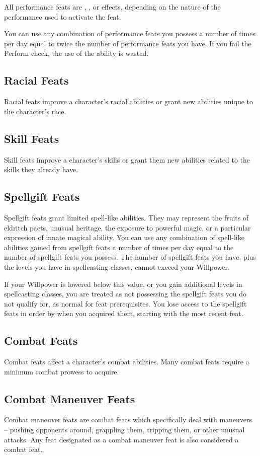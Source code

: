 All performance feats are , , or  effects, depending on the nature of the performance used to activate the feat.

You can use any combination of performance feats you possess a number of times per day equal to twice the number of performance feats you have.
If you fail the Perform check, the use of the ability is wasted.

\subsection{Racial Feats}\label{Racial Feats}
Racial feats improve a character's racial abilities or grant new abilities unique to the character's race.

\subsection{Skill Feats}
Skill feats improve a character's skills or grant them new abilities related to the skills they already have.

\subsection{Spellgift Feats}
Spellgift feats grant limited spell-like abilities.
They may represent the fruits of eldritch pacts, unusual heritage, the exposure to powerful magic, or a particular expression of innate magical ability.
You can use any combination of spell-like abilities gained from spellgift feats a number of times per day equal to the number of spellgift feats you possess.
The number of spellgift feats you have, plus the levels you have in spellcasting classes, cannot exceed your Willpower.

If your Willpower is lowered below this value, or you gain additional levels in spellcasting classes, you are treated as not possessing the spellgift feats you do not qualify for, as normal for feat prerequisites.
You lose access to the spellgift feats in order by when you acquired them, starting with the most recent feat.

\subsection{Combat Feats}
Combat feats affect a character's combat abilities.
Many combat feats require a minimum combat prowess to acquire.

\subsection{Combat Maneuver Feats}
Combat maneuver feats are combat feats which specifically deal with maneuvers -- pushing opponents around, grappling them, tripping them, or other unusual attacks.
Any feat designated as a combat maneuver feat is also considered a combat feat.

